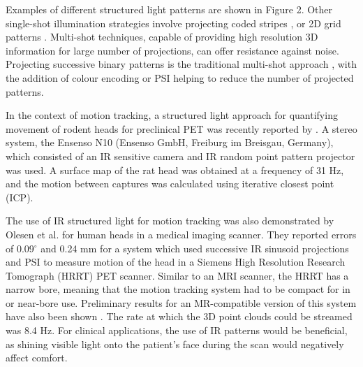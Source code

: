 \documentclass[class=article, crop=false]{standalone}
\begin{document}
\par
Examples of different structured light patterns are shown in Figure 2. Other single-shot illumination strategies involve projecting coded stripes \parencite{Boyer1987,Forster2007,Zhang2002}, or 2D grid patterns \parencite{Petriu2000,Pages2006,Albitar2006}. Multi-shot techniques, capable of providing high resolution 3D information for large number of projections, can offer resistance against noise. Projecting successive binary patterns is the traditional multi-shot approach \parencite{Posdamer1982}, with the addition of colour encoding \parencite{Caspi1998} or PSI \parencite{Huang2006} helping to reduce the number of projected patterns.
\par
In the context of motion tracking, a structured light approach for quantifying movement of rodent heads for preclinical PET was recently reported by \cite{Miranda2017}. A stereo system, the Ensenso N10 (Ensenso GmbH, Freiburg im Breisgau, Germany), which consisted of an IR sensitive camera and IR random point pattern projector was used. A surface map of the rat head was obtained at a frequency of 31 Hz, and the motion between captures was calculated using iterative closest point (ICP).
\par 
The use of IR structured light for motion tracking was also demonstrated by Olesen et al. \parencite*{Olesen2012} for human heads in a medical imaging scanner. They reported errors of 0.09$^{\circ}$ and 0.24 mm for a system which used successive IR sinusoid projections and PSI to measure motion of the head in a Siemens High Resolution Research Tomograph (HRRT) PET scanner. Similar to an MRI scanner, the HRRT has a narrow bore, meaning that the motion tracking system had to be compact for in or near-bore use. Preliminary results for an MR-compatible version of this system have also been shown \parencite{Olesen2015a}. The rate at which the 3D point clouds could be streamed was 8.4 Hz. For clinical applications, the use of IR patterns would be beneficial, as shining visible light onto the patient's face during the scan would negatively affect comfort.
\par



	
\end{document}
